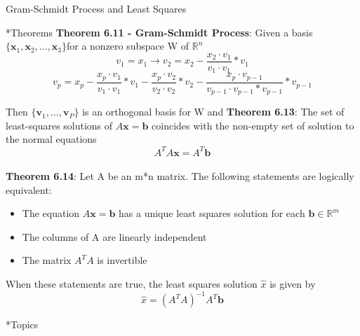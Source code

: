 \documentclass[a4paper, 12pt]{article}
\begin{document}
\newpage
\begin{section}{Gram-Schmidt Process and Least Squares}
\begin{subsection}*{Theorems}
\textbf{Theorem 6.11 - Gram-Schmidt Process}: Given a basis $\{\textbf{x}_{1}
,\textbf{x}_{2},\dots,\textbf{x}_{3}\}$for a nonzero subspace W of $\mathbb{R}^{n}$ \\
\begin{equation}
v_1=x_1 \to 
v_2=x_2-\frac{x_2\cdot v_1}{v_1\cdot v_1}*v_1
\end{equation}
\begin{equation}
v_{p}=x_{p}-\frac{x_{p}\cdot v_1}{v_1\cdot v_1}*v_1 - 
\frac{x_{p} \cdot v_2}{v_2 \cdot v_2}*v_2
-\frac{x_{p} \cdot v_{p-1}}{v_{p-1}\cdot v_{p-1}*v_{p-1}}*v_{p-1}
\end{equation}

Then $\{\textbf{v}_{1},\dots,\textbf{v}_{P}\}$ is an orthogonal basis for W and 
\noindent \textbf{Theorem 6.13}: The set of least-squares solutions of $A\textbf{x}
=\textbf{b}$ coincides with the non-empty set of solution to the normal equations
\begin{equation} \label{Least Square}
A^{T}A\textbf{x}=A^{T}\textbf{b}
\end{equation}
\\ \noindent \textbf{Theorem 6.14}: Let A be an m*n matrix. The following
statements are logically equivalent:
\begin{itemize}
\item{The equation $A\textbf{x}=\textbf{b}$ has a unique least squares solution
for each $\textbf{b}\in\mathbb{R}^{m}$}
\item{The columns of A are linearly independent}
\item{The matrix $A^{T}A$ is invertible}
\end{itemize}
When these statements are true, the least squares solution $\hat{x}$ is given by
\begin{equation}
	\hat{x}=(A^{T}A)^{-1}A^{T}\textbf{b}
\end{equation}
\end{subsection}
\begin{subsection}*{Topics}


\end{subsection}
\end{section}
\end{document}
